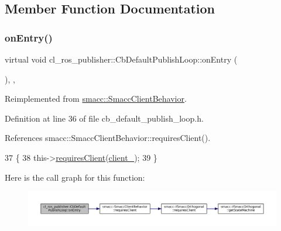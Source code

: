 \subsection{Member Function Documentation}
\mbox{\label{classcl__ros__publisher_1_1CbDefaultPublishLoop_a6e6cfb477cbefc510ca7b55a061545e4}} 
\subsubsection{\texorpdfstring{on\+Entry()}{onEntry()}}
{\footnotesize\ttfamily virtual void cl\+\_\+ros\+\_\+publisher\+::\+Cb\+Default\+Publish\+Loop\+::on\+Entry (\begin{DoxyParamCaption}{ }\end{DoxyParamCaption})\hspace{0.3cm}{\ttfamily [inline]}, {\ttfamily [override]}, {\ttfamily [virtual]}}



Reimplemented from \hyperlink{classsmacc_1_1SmaccClientBehavior_a7962382f93987c720ad432fef55b123f}{smacc\+::\+Smacc\+Client\+Behavior}.



Definition at line 36 of file cb\+\_\+default\+\_\+publish\+\_\+loop.\+h.



References smacc\+::\+Smacc\+Client\+Behavior\+::requires\+Client().


\begin{DoxyCode}
37     \{
38         this->\hyperlink{classsmacc_1_1SmaccClientBehavior_a917f001e763a1059af337bf4e164f542}{requiresClient}(\hyperlink{classcl__ros__publisher_1_1CbDefaultPublishLoop_a483b8c34b88dadc718fbf4bf1f95acb5}{client\_});
39     \}
\end{DoxyCode}
Here is the call graph for this function\+:
\nopagebreak
\begin{figure}[H]
\begin{center}
\leavevmode
\includegraphics[width=350pt]{classcl__ros__publisher_1_1CbDefaultPublishLoop_a6e6cfb477cbefc510ca7b55a061545e4_cgraph}
\end{center}
\end{figure}
\mbox{\label{classcl__ros__publisher_1_1CbDefaultPublishLoop_a206c6bc09e7c6414304b679ec415c19f}} 
